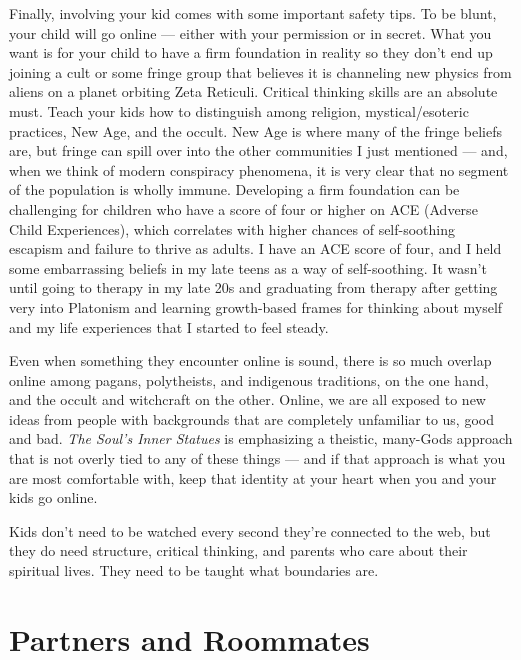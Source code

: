 \documentclass[
]{book}
\begin{document}
Finally, involving your kid comes with some important safety tips. To be blunt, your child will go online --- either with your permission or in secret. What you want is for your child to have a firm foundation in reality so they don't end up joining a cult or some fringe group that believes it is channeling new physics from aliens on a planet orbiting Zeta Reticuli. Critical thinking skills are an absolute must. Teach your kids how to distinguish among religion, mystical/esoteric practices, New Age, and the occult. New Age is where many of the fringe beliefs are, but fringe can spill over into the other communities I just mentioned --- and, when we think of modern conspiracy phenomena, it is very clear that no segment of the population is wholly immune. Developing a firm foundation can be challenging for children who have a score of four or higher on ACE (Adverse Child Experiences), which correlates with higher chances of self-soothing escapism and failure to thrive as adults. I have an ACE score of four, and I held some embarrassing beliefs in my late teens as a way of self-soothing. It wasn't until going to therapy in my late 20s and graduating from therapy after getting very into Platonism and learning growth-based frames for thinking about myself and my life experiences that I started to feel steady.

Even when something they encounter online is sound, there is so much overlap online among pagans, polytheists, and indigenous traditions, on the one hand, and the occult and witchcraft on the other. Online, we are all exposed to new ideas from people with backgrounds that are completely unfamiliar to us, good and bad. \emph{The Soul's Inner Statues} is emphasizing a theistic, many-Gods approach that is not overly tied to any of these things --- and if that approach is what you are most comfortable with, keep that identity at your heart when you and your kids go online.

Kids don't need to be watched every second they're connected to the web, but they do need structure, critical thinking, and parents who care about their spiritual lives. They need to be taught what boundaries are.

\hypertarget{partners-and-roommates}{%
\section{Partners and Roommates}\label{partners-and-roommates}}
\end{document}
